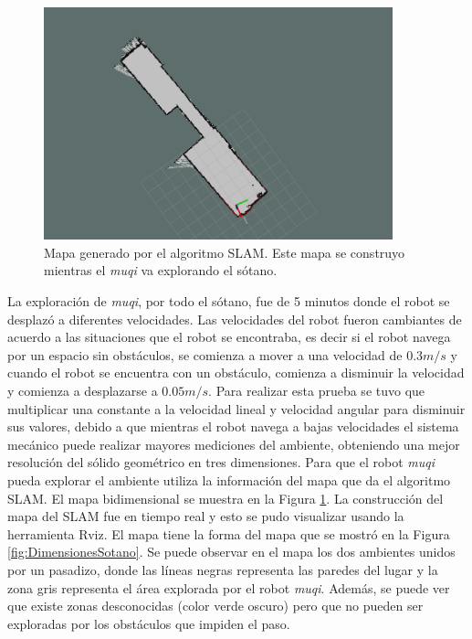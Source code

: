 \begin{figure}
  \centering \footnotesize
  \includegraphics[width=0.90\textwidth]{images/2DSotanoSLAM.png}
  \captionsetup{font=footnotesize}
  \caption{Mapa generado por el algoritmo SLAM. Este mapa se construyo mientras el
  \textit{muqi} va explorando el sótano.}
  \label{fig:slamSotano}
\end{figure}

La exploración de \textit{muqi}, por todo el sótano, fue de 5 minutos donde el robot se
desplazó a diferentes velocidades. Las velocidades del robot fueron cambiantes de acuerdo 
a las situaciones que el robot se encontraba, es decir si el robot navega por un espacio 
sin obstáculos, se comienza a mover a una velocidad de $0.3 m/s$ y cuando el robot 
se encuentra con un obstáculo, comienza a disminuir la velocidad y comienza a
desplazarse a $0.05 m/s$. Para realizar esta prueba se tuvo que multiplicar una constante 
a la velocidad lineal y velocidad angular para disminuir sus valores, debido a que mientras 
el robot navega a bajas velocidades el sistema mecánico puede realizar mayores mediciones 
del ambiente, obteniendo una mejor resolución del sólido geométrico en tres dimensiones. 
Para que el robot \textit{muqi} pueda explorar el ambiente utiliza la información del mapa 
que da el algoritmo SLAM. El mapa bidimensional se muestra en la Figura \ref{fig:slamSotano}. 
La construcción del mapa del SLAM fue en tiempo real y esto se pudo visualizar usando la 
herramienta Rviz. El mapa tiene la forma del mapa que se mostró en la Figura 
\ref{fig:DimensionesSotano}. Se puede observar en el mapa los dos ambientes unidos por un 
pasadizo, donde las líneas negras representa las paredes del lugar y la zona gris representa 
el área explorada por el robot \textit{muqi}. Además, se puede ver que existe zonas 
desconocidas (color verde oscuro) pero que no pueden ser exploradas por los obstáculos que 
impiden el paso.



